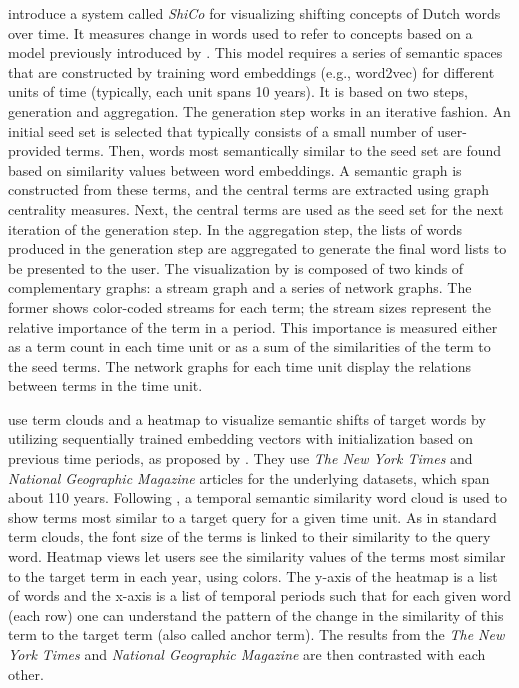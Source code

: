 \documentclass[output=paper]{langsci/langscibook}
\begin{document}
\citet{martinez2016design} introduce a system called \emph{ShiCo} for visualizing shifting concepts of Dutch words over time. It measures change in words used to refer to concepts based on a model previously introduced by \citet{kenter2015ad}. This model requires a series of semantic spaces that are constructed by training word embeddings (e.g., word2vec) for different units of time (typically, each unit spans 10 years). It is based on two steps, generation and
aggregation. The generation step works in an iterative fashion. An initial seed set is selected that typically consists of a small number of user-provided terms. Then, words most semantically similar to the seed set are found based on similarity values between word embeddings. A semantic graph is constructed from these terms, and the central terms are extracted using graph centrality measures. Next, the central terms are used as the seed set for the next iteration of the generation step. In the
aggregation step, the lists of words produced in the generation step are aggregated to generate the final word lists to be presented to the user.
The visualization by \citet{martinez2016design} is composed of two kinds of complementary graphs: a stream graph and a series of network graphs. The former shows color-coded streams for each term; the stream sizes represent the relative importance of the term in a period. This importance is measured either as  a term count in each time unit or as a sum of the similarities of the term to the seed terms. The network graphs for each time unit display the relations between terms in the time unit. 

\citet{xu2017temporal} use term clouds and a heatmap to visualize semantic shifts of target words by utilizing sequentially trained embedding vectors with initialization based on previous time periods, as proposed by \citet{kim-etal-2014-temporal}. They use \textit{The New York Times} and \textit{National Geographic Magazine} articles for the underlying datasets, which span about 110 years. Following \citet{martinez2016design}, a temporal semantic similarity word cloud is used to show terms most similar to a target query for a given time unit. As in standard term clouds, the font size of the terms is linked to their similarity to the query word. Heatmap views let users see the similarity values of the terms most similar to the target term in each year, using colors. The y-axis of the heatmap is a list of words and the x-axis is a list of temporal periods such that for each given word (each row) one can understand the pattern of the change in the similarity of this term to the target term (also called anchor term). The results from the \textit{The New York Times} and \textit{National Geographic Magazine} are then contrasted with each other. 
\end{document}

